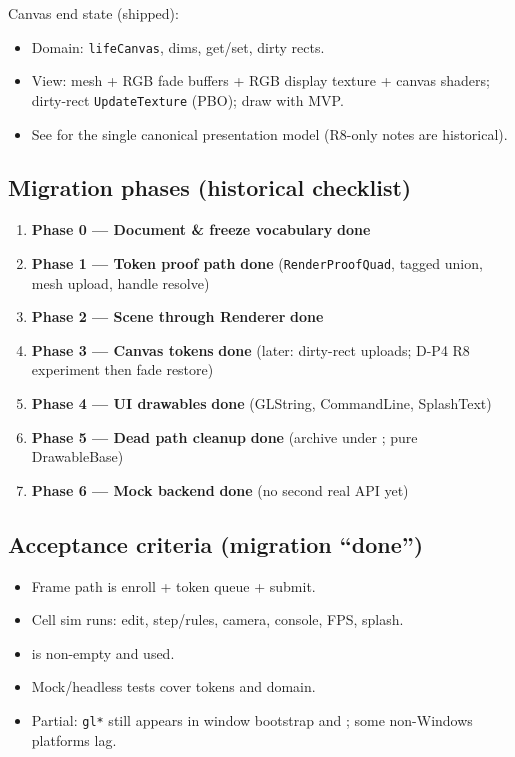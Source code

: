 Canvas end state (shipped):
\begin{itemize}
  \item Domain: \texttt{lifeCanvas}, dims, get/set, dirty rects.
  \item View: mesh + RGB fade buffers + RGB display texture + canvas shaders;
        dirty-rect \texttt{UpdateTexture} (PBO); draw with MVP.
  \item See  for the single canonical
        presentation model (R8-only notes are historical).
\end{itemize}

\subsection{Migration phases (historical checklist)}
\label{sec:migration-phases}

\begin{enumerate}[leftmargin=*]
  \item \textbf{Phase 0 --- Document \& freeze vocabulary} \quad \textbf{done}
  \item \textbf{Phase 1 --- Token proof path} \quad \textbf{done}
        (\texttt{RenderProofQuad}, tagged union, mesh upload, handle resolve)
  \item \textbf{Phase 2 --- Scene through Renderer} \quad \textbf{done}
  \item \textbf{Phase 3 --- Canvas tokens} \quad \textbf{done}
        (later: dirty-rect uploads; D-P4 R8 experiment then fade restore)
  \item \textbf{Phase 4 --- UI drawables} \quad \textbf{done}
        (GLString, CommandLine, SplashText)
  \item \textbf{Phase 5 --- Dead path cleanup} \quad \textbf{done}
        (archive under ; pure DrawableBase)
  \item \textbf{Phase 6 --- Mock backend} \quad \textbf{done}
        (no second real API yet)
\end{enumerate}

\subsection{Acceptance criteria (migration ``done'')}
\begin{itemize}
  \item[\checkmark] Frame path is enroll + token queue + submit.
  \item[\checkmark] Cell sim runs: edit, step/rules, camera, console, FPS, splash.
  \item[\checkmark]  is non-empty and used.
  \item[\checkmark] Mock/headless tests cover tokens and domain.
  \item Partial: \texttt{gl*} still appears in window bootstrap and
        ; some non-Windows platforms lag.
\end{itemize}

